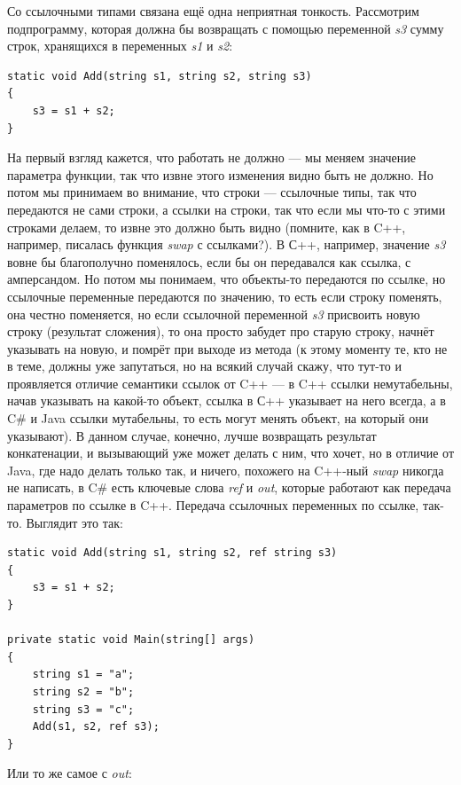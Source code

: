 \documentclass[a5paper]{article}
\begin{document}
Со ссылочными типами связана ещё одна неприятная тонкость. Рассмотрим подпрограмму, которая должна бы возвращать с помощью переменной \textit{s3} сумму строк, хранящихся в переменных \textit{s1} и \textit{s2}:

\begin{verbatim}
static void Add(string s1, string s2, string s3)
{
    s3 = s1 + s2;
}
\end{verbatim}

На первый взгляд кажется, что работать не должно --- мы меняем значение параметра функции, так что извне этого изменения видно быть не должно. Но потом мы принимаем во внимание, что строки --- ссылочные типы, так что передаются не сами строки, а ссылки на строки, так что если мы что-то с этими строками делаем, то извне это должно быть видно (помните, как в C++, например, писалась функция \textit{swap} с ссылками?). В С++, например, значение \textit{s3} вовне бы благополучно поменялось, если бы он передавался как ссылка, с амперсандом. Но потом мы понимаем, что объекты-то передаются по ссылке, но ссылочные переменные передаются по значению, то есть если строку поменять, она честно поменяется, но если ссылочной переменной \textit{s3} присвоить новую строку (результат сложения), то она просто забудет про старую строку, начнёт указывать на новую, и помрёт при выходе из метода (к этому моменту те, кто не в теме, должны уже запутаться, но на всякий случай скажу, что тут-то и проявляется отличие семантики ссылок от C++ --- в C++ ссылки немутабельны, начав указывать на какой-то объект, ссылка в С++ указывает на него всегда, а в C\# и Java ссылки мутабельны, то есть могут менять объект, на который они указывают). В данном случае, конечно, лучше возвращать результат конкатенации, и вызывающий уже может делать с ним, что хочет, но в отличие от Java, где надо делать только так, и ничего, похожего на C++-ный \textit{swap} никогда не написать, в C\# есть ключевые слова \textit{ref} и \textit{out}, которые работают как передача параметров по ссылке в C++. Передача ссылочных переменных по ссылке, так-то. Выглядит это так:

\begin{verbatim}
static void Add(string s1, string s2, ref string s3)
{
    s3 = s1 + s2;
}

private static void Main(string[] args)
{
    string s1 = "a";
    string s2 = "b";
    string s3 = "c";
    Add(s1, s2, ref s3);
}
\end{verbatim}

Или то же самое с \textit{out}:
\end{document}
